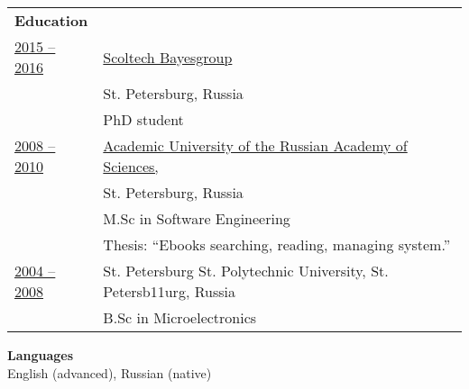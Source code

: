 \documentclass[letterpaper,11pt,oneside]{article}
\begin{document}
\noindent \begin{tabular}{@{} l l}

\noindent \textbf{Education}  & \vspace{1em} \\

\underline{2015 -- 2016}     &  \hspace{10mm}\href{https://cs.hse.ru/en/bayesgroup/}{Scoltech Bayesgroup}   \\
                             &  \hspace{10mm}St. Petersburg, Russia  \\
                             &  \hspace{10mm}PhD student \vspace{1em} \\

\underline{2008 -- 2010}     &  \hspace{10mm}\href{http://mit.spbau.ru/en/about}{Academic University of the Russian Academy of Sciences, }  \\
                             &  \hspace{10mm}St. Petersburg, Russia  \\
                             &  \hspace{10mm}M.Sc in Software Engineering  \\                             
                             &  \hspace{10mm}Thesis: “Ebooks searching, reading, managing system.”  \vspace{1em} \\                             

\underline{2004 -- 2008}     &  \hspace{10mm}St. Petersburg St. Polytechnic University, St. Petersb11urg, Russia   \\
                             &  \hspace{10mm}B.Sc in Microelectronics \vspace{1em} \\

\end{tabular}

\noindent \textbf{Languages} \vspace{1em} \\
\noindent English (advanced), Russian (native)
\end{document}
